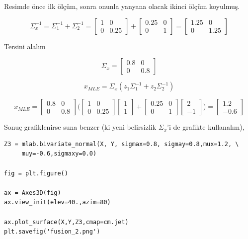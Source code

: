 \documentclass[12pt,fleqn]{article}\usepackage{../../common}
\begin{document}
Resimde önce ilk ölçüm, sonra onunla yanyana olacak ikinci ölçüm koyulmuş. 

$$ \Sigma_x^{-1} = \Sigma_1^{-1} + \Sigma_2^{-1}  =
\left[\begin{array}{cc}
1 & 0 \\ 0 & 0.25
\end{array}\right] + 
\left[\begin{array}{cc}
0.25 & 0 \\ 0 & 1
\end{array}\right] =
\left[\begin{array}{cc}
1.25 & 0 \\ 0 & 1.25
\end{array}\right] 
$$

Tersini alalım 

$$ \Sigma_x =
\left[\begin{array}{cc}
0.8 & 0 \\ 0 & 0.8
\end{array}\right] 
$$

$$ x_{MLE} =  \Sigma_x (z_1\Sigma_1^{-1}  + z_2\Sigma_2^{-1}) $$

$$ 
x_{MLE} =
\left[\begin{array}{cc}
0.8 & 0 \\ 0 & 0.8
\end{array}\right] 
\bigg(
\left[\begin{array}{cc}
1 & 0 \\ 0 & 0.25
\end{array}\right] 
\left[\begin{array}{c}
1 \\ 1
\end{array}\right]  + 
\left[\begin{array}{cc}
0.25 & 0 \\ 0 & 1
\end{array}\right] 
\left[\begin{array}{r}
2 \\ -1
\end{array}\right]  
\bigg) = 
\left[\begin{array}{r}
1.2 \\ -0.6
\end{array}\right]  
$$

Sonuç grafiklenirse suna benzer (ki yeni belirsizlik $\Sigma_x$'i de
grafikte kullanalım),

\begin{verbatim}
Z3 = mlab.bivariate_normal(X, Y, sigmax=0.8, sigmay=0.8,mux=1.2, \
     muy=-0.6,sigmaxy=0.0)

fig = plt.figure()

ax = Axes3D(fig)
ax.view_init(elev=40.,azim=80)

ax.plot_surface(X,Y,Z3,cmap=cm.jet)
plt.savefig('fusion_2.png')
\end{verbatim}
\end{document}
